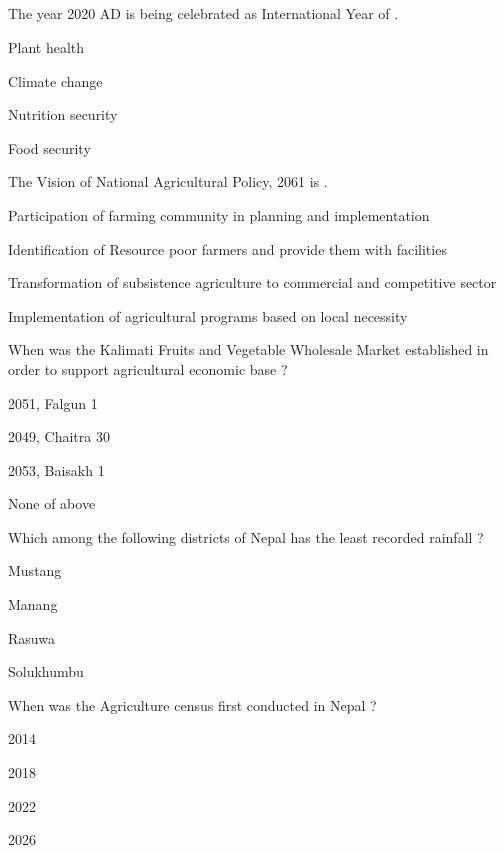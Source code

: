 
\subsection*{}

\begin{questions}

\question The year 2020 AD is being celebrated as International Year of \fillin[][3cm].
\begin{items}
\item* Plant health
\item Climate change
\item Nutrition security
\item Food security
\end{items}

\question The Vision of National Agricultural Policy, 2061 is \fillin[][3cm].
\begin{items}
\item Participation of farming community in planning and implementation
\item Identification of Resource poor farmers and provide them with facilities
\item* Transformation of subsistence agriculture to commercial and competitive sector
\item Implementation of agricultural programs based on local necessity
\end{items}

\question When was the Kalimati Fruits and Vegetable Wholesale Market established in order to support agricultural economic base ?
\begin{items}
\item* 2051, Falgun 1
\item 2049, Chaitra 30
\item 2053, Baisakh 1
\item None of above
\end{items}

\question Which among the following districts of Nepal has the least recorded rainfall ?
\begin{items}
\item* Mustang
\item Manang
\item Rasuwa
\item Solukhumbu
\end{items}

\question When was the Agriculture census first conducted in Nepal ?
\begin{items}
\item 2014
\item* 2018
\item 2022
\item 2026
\end{items}


\end{questions}
